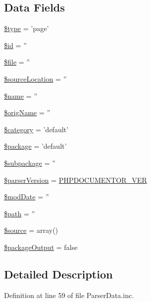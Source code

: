 \subsection*{\-Data \-Fields}
\begin{DoxyCompactItemize}
\item 
\hyperlink{classparser_page_a9a4a6fba2208984cabb3afacadf33919}{\$type} = 'page'
\item 
\hyperlink{classparser_page_ae97941710d863131c700f069b109991e}{\$id} = ''
\item 
\hyperlink{classparser_page_aa1bfbd27060176201b271918dff57e8f}{\$file} = ''
\item 
\hyperlink{classparser_page_a998b4c54041db5cd50185166322ad3ca}{\$source\-Location} = ''
\item 
\hyperlink{classparser_page_ab2fc40d43824ea3e1ce5d86dee0d763b}{\$name} = ''
\item 
\hyperlink{classparser_page_a76452cd63c66786618e7b83070d7a709}{\$orig\-Name} = ''
\item 
\hyperlink{classparser_page_a18b2a8d133fa7733bf34abcc6ca2ef5b}{\$category} = 'default'
\item 
\hyperlink{classparser_page_a365395516cc195292e97e09bc0d165ae}{\$package} = 'default'
\item 
\hyperlink{classparser_page_ac601dc8dc2a086b6381128cc9c7a3fc5}{\$subpackage} = ''
\item 
\hyperlink{classparser_page_a6a78577583114ac061a3fba3350fd4df}{\$parser\-Version} = \hyperlink{top_8php_a81d37434d16bfdfff23e418fa4f0e37e}{\-P\-H\-P\-D\-O\-C\-U\-M\-E\-N\-T\-O\-R\-\_\-\-V\-E\-R}
\item 
\hyperlink{classparser_page_a609cb081c0f2153634104dd84f3693f9}{\$mod\-Date} = ''
\item 
\hyperlink{classparser_page_a0a4baf0b22973c07685c3981f0d17fc4}{\$path} = ''
\item 
\hyperlink{classparser_page_a99a2b085f0a29bd5d799fdcbb63d261b}{\$source} = array()
\item 
\hyperlink{classparser_page_a62868ddf3244bfad64daf381e2c65f5a}{\$package\-Output} = false
\end{DoxyCompactItemize}


\subsection{\-Detailed \-Description}


\-Definition at line 59 of file \-Parser\-Data.\-inc.



